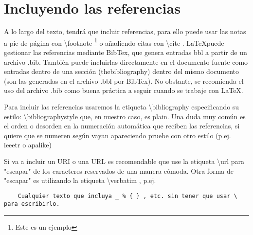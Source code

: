 \section{Incluyendo las referencias}

A lo largo del texto, tendrá que incluir referencias, para ello puede usar las notas a pie de página con \textbackslash footnote \footnote{Este es un ejemplo} o añadiendo citas con \textbackslash cite \cite{mrx05,prueba2}. \LaTeX puede gestionar las referencias mediante BibTex, que genera entradas bbl a partir de un archivo .bib. También puede incluirlas directamente en el documento fuente como entradas dentro de una sección (thebibliography) dentro del mismo documento (son las generadas en el archivo .bbl por BibTex). No obstante, se recomienda el uso del archivo .bib como buena práctica a seguir cuando se trabaje con \LaTeX.

Para incluir las referencias usaremos la etiqueta \textbackslash bibliography especificando su estilo: \textbackslash bibliographystyle que, en nuestro caso, es plain. Una duda muy común es el orden o desorden en la numeración automática que reciben las referencias, si quiere que se numeren según vayan apareciendo pruebe con otro estilo (p.ej. ieeetr o apalike)

Si va a incluir un URI o una URL es recomendable que use la etiqueta \textbackslash url para "escapar" de los caracteres reservados de una manera cómoda. Otra forma de "escapar" es utilizando la etiqueta \textbackslash verbatim , p.ej. 

\begin{verbatim}
	Cualquier texto que incluya _ % { } , etc. sin tener que usar \ para escribirlo.
\end{verbatim}



